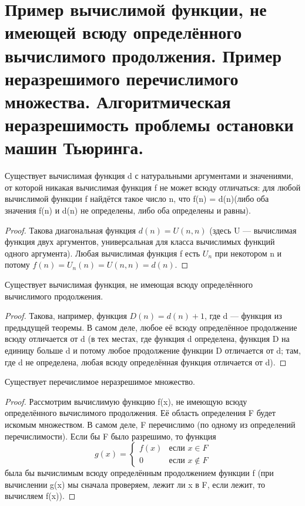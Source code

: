 \section{Пример вычислимой функции, не имеющей всюду определённого вычислимого продолжения. Пример неразрешимого
перечислимого множества. Алгоритмическая неразрешимость проблемы остановки машин Тьюринга.}
\begin{theorem}
	Существует вычислимая функция d с натуральными аргументами и значениями, от которой никакая вычислимая функция
	f не может всюду отличаться: для любой вычислимой функции f найдётся такое число n, что f(n) = d(n)(либо оба
	значения f(n) и d(n) не определены, либо оба определены и равны).
\end{theorem}
\begin{proof}
	Такова диагональная функция $d(n) = U(n,n)$ (здесь U — вычислимая функция двух аргументов, универсальная для
	класса вычислимых функций одного аргумента). Любая вычислимая функция f есть $U_n$ при некотором n и потому
	$f(n) = U_n(n) = U(n,n) = d(n)$.
\end{proof}
\begin{theorem}
	Существует вычислимая функция, не имеющая всюду определённого вычислимого продолжения.
\end{theorem}
\begin{proof}
	Такова, например, функция $D(n) = d(n) + 1$, где d — функция из предыдущей теоремы. В самом деле, любое её
	всюду определённое продолжение всюду отличается от d (в тех местах, где функция d определена, функция D на
	единицу больше d и потому любое продолжение функции D отличается от d; там, где d не определена, любая всюду
	определённая функция отличается от d).
\end{proof}
\begin{theorem}
	Существует перечислимое неразрешимое множество.
\end{theorem}
\begin{proof}
	Рассмотрим вычислимую функцию f(x), не имеющую всюду определённого вычислимого продолжения. Её область
	определения F будет искомым множеством. В самом деле, F перечислимо (по одному из определений перечислимости).
	Если бы F было разрешимо, то функция
	\begin{equation*}
		g(x) = 
		\begin{cases}
			f(x) &\text{если $x \in F$}\\
			0 &\text{если $x \notin F$}
		\end{cases}
	\end{equation*} 
	была бы вычислимым всюду определённым продолжением функции f (при вычислении g(x) мы сначала проверяем, лежит
	ли x в F, если лежит, то вычисляем f(x)).
\end{proof}

